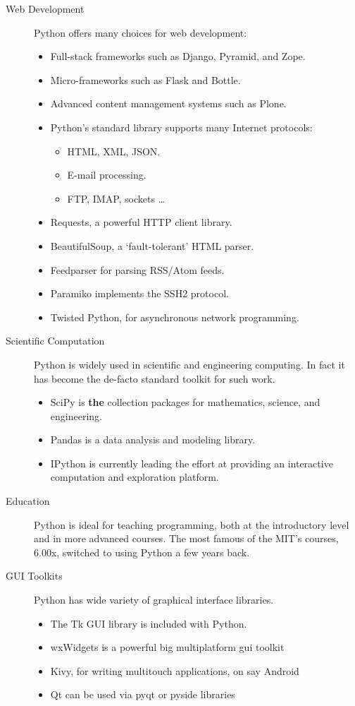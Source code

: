\documentclass[11pt,a4paper]{article}
\begin{document}
    \begin{description}
    \item[Web Development] Python offers many choices for web development:
        \begin{itemize}
            \item Full-stack frameworks such as Django, Pyramid, and Zope.
            \item Micro-frameworks such as Flask and Bottle.
            \item Advanced content management systems such as Plone.
            \item Python's standard library supports many Internet protocols:
                \begin{itemize} 
                    \item HTML, XML, JSON.
                    \item E-mail processing.
                    \item FTP, IMAP, sockets \ldots
                \end{itemize}
            \item Requests, a powerful HTTP client library.
            \item BeautifulSoup, a `fault-tolerant' HTML parser.
            \item Feedparser for parsing RSS/Atom feeds.
            \item Paramiko implements the SSH2 protocol.
            \item Twisted Python, for asynchronous network programming.
        \end{itemize}
    \item[Scientific Computation] Python is widely used in scientific and engineering computing. In fact it has become the de-facto standard toolkit for such work. 
    \begin{itemize}
        \item SciPy is \textbf{the} collection packages for mathematics, science, and engineering.
        \item Pandas is a data analysis and modeling library.
        \item IPython is currently leading the effort at providing an interactive computation and exploration platform.
    \end{itemize}
\item[Education] Python is ideal for teaching programming, both at the introductory level and in more advanced courses. The most famous of the MIT's courses, 6.00x, switched to using Python a few years back.
\item[GUI Toolkits] Python has wide variety of graphical interface libraries.
    \begin{itemize} 
        \item The Tk GUI library is included with Python.
        \item wxWidgets is a powerful big multiplatform gui toolkit
        \item Kivy, for writing multitouch applications, on say Android
        \item Qt can be used via pyqt or pyside libraries
    \end{itemize}
    \end{description}
\end{document}
